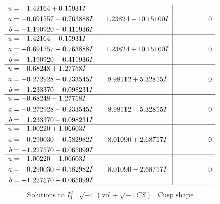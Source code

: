 \documentclass[1p]{elsarticle_modified}
\theoremstyle{definition}
\newcommand{\I}{\sqrt{-1}}
\begin{document}
$$\begin{array}{c|c|c}
\begin{aligned}
u &= \phantom{-}1.42164 + 0.15931 I \\
a &= -0.691557 + 0.763888 I \\
b &= -1.190920 + 0.411936 I\end{aligned}
 & \phantom{-}1.23824 - 10.15100 I & \phantom{-0.000000 } 0 \\ \hline\begin{aligned}
u &= \phantom{-}1.42164 - 0.15931 I \\
a &= -0.691557 - 0.763888 I \\
b &= -1.190920 - 0.411936 I\end{aligned}
 & \phantom{-}1.23824 + 10.15100 I & \phantom{-0.000000 } 0 \\ \hline\begin{aligned}
u &= -0.68248 + 1.27758 I \\
a &= -0.272928 + 0.233545 I \\
b &= \phantom{-}1.233370 + 0.098231 I\end{aligned}
 & \phantom{-}8.98112 + 5.32815 I & \phantom{-0.000000 } 0 \\ \hline\begin{aligned}
u &= -0.68248 - 1.27758 I \\
a &= -0.272928 - 0.233545 I \\
b &= \phantom{-}1.233370 - 0.098231 I\end{aligned}
 & \phantom{-}8.98112 - 5.32815 I & \phantom{-0.000000 } 0 \\ \hline\begin{aligned}
u &= -1.00220 + 1.06603 I \\
a &= \phantom{-}0.290030 - 0.582982 I \\
b &= -1.227570 - 0.065099 I\end{aligned}
 & \phantom{-}8.01090 + 2.68717 I & \phantom{-0.000000 } 0 \\ \hline\begin{aligned}
u &= -1.00220 - 1.06603 I \\
a &= \phantom{-}0.290030 + 0.582982 I \\
b &= -1.227570 + 0.065099 I\end{aligned}
 & \phantom{-}8.01090 - 2.68717 I & \phantom{-0.000000 } 0\\
 \hline 
 \end{array}$$\newpage$$\begin{array}{c|c|c}  
\text{Solutions to }I^u_{1}& \I (\text{vol} + \sqrt{-1}CS) & \text{Cusp shape}\\
 \hline 
\begin{aligned}

\end{aligned}
\end{array}$$
\end{document}

